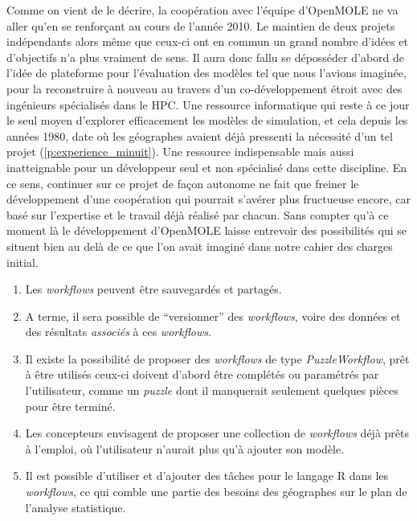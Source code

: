 
Comme on vient de le décrire, la coopération avec l'équipe d'OpenMOLE ne va aller qu'en se renforçant au cours de l'année 2010. Le maintien de deux projets indépendants alors même que ceux-ci ont en commun un grand nombre d'idées et d'objectifs n'a plus vraiment de sens. Il aura donc fallu se déposséder d'abord de l'idée de plateforme pour l'évaluation des modèles tel que nous l'avions imaginée, pour la reconstruire à nouveau au travers d'un co-développement étroit avec des ingénieurs spécialisés dans le HPC. Une ressource informatique qui reste à ce jour le seul moyen d'explorer efficacement les modèles de simulation, et cela depuis les années 1980, date où les géographes avaient déjà pressenti la nécessité d'un tel projet (\ref{p:experience_minuit}). Une ressource indispensable mais aussi inatteignable pour un développeur seul et non spécialisé dans cette discipline. En ce sens, continuer sur ce projet de façon autonome ne fait que freiner le développement d'une coopération qui pourrait s'avérer plus fructueuse encore, car basé sur l'expertise et le travail déjà réalisé par chacun. Sans compter qu'à ce moment là le développement d'OpenMOLE laisse entrevoir des possibilités qui se situent bien au delà de ce que l'on avait imaginé dans notre cahier des charges initial.

\begin{enumerate}[label=(\alph*),labelindent=\parindent,leftmargin=*]
\item Les \textit{workflows} peuvent être sauvegardés et partagés.
\item A terme, il sera possible de \enquote{versionner} des \textit{workflows}, voire des données et des résultats \textit{associés} à ces \textit{workflows}.
\item Il existe la possibilité de proposer des \textit{workflows} de type \textit{PuzzleWorkflow}, prêt à être utilisés ceux-ci doivent d'abord être complétés ou paramétrés par l'utilisateur, comme un \textit{puzzle} dont il manquerait seulement quelques pièces pour être terminé.
\item Les concepteurs envisagent de proposer une collection de \textit{workflows} déjà prêts à l'emploi, où l'utilisateur n'aurait plus qu'à ajouter son modèle.
\item Il est possible d'utiliser et d'ajouter des tâches pour le langage R dans les \textit{workflows}, ce qui comble une partie des besoins des géographes sur le plan de l'analyse statistique.
\end{enumerate}

